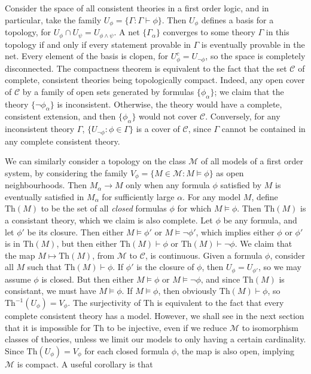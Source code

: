 Consider the space of all consistent theories in a first order logic, and in particular, take the family $U_\phi = \{ \Gamma : \Gamma \vdash \phi \}$. Then $U_\phi$ defines a basis for a topology, for $U_\phi \cap U_\psi = U_{\phi \wedge \psi}$. A net $\{ \Gamma_\alpha \}$ converges to some theory $\Gamma$ in this topology if and only if every statement provable in $\Gamma$ is eventually provable in the net. Every element of the basis is clopen, for $U_\phi^c = U_{\neg \phi}$, so the space is completely disconnected. The compactness theorem is equivalent to the fact that the set $\mathcal{C}$ of complete, consistent theories being topologically compact. Indeed, any open cover of $\mathcal{C}$ by a family of open sets generated by formulas $\{ \phi_\alpha \}$; we claim that the theory $\{ \neg \phi_\alpha \}$ is inconsistent. Otherwise, the theory would have a complete, consistent extension, and then $\{ \phi_\alpha \}$ would not cover $\mathcal{C}$. Conversely, for any inconsistent theory $\Gamma$, $\{ U_{\neg \phi} : \phi \in \Gamma \}$ is a cover of $\mathcal{C}$, since $\Gamma$ cannot be contained in any complete consistent theory.

We can similarly consider a topology on the class $\mathcal{M}$ of all models of a first order system, by considering the family $V_\phi = \{ M \in \mathcal{M} : M \vDash \phi \}$ as open neighbourhoods. Then $M_\alpha \to M$ only when any formula $\phi$ satisfied by $M$ is eventually satisfied in $M_\alpha$ for sufficiently large $\alpha$. For any model $M$, define $\text{Th}(M)$ to be the set of all {\it closed} formulas $\phi$ for which $M \vDash \phi$. Then $\text{Th}(M)$ is a consistant theory, which we claim is also complete. Let $\phi$ be any formula, and let $\phi'$ be its closure. Then either $M \vDash \phi'$ or $M \vDash \neg \phi'$, which implies either $\phi$ or $\phi'$ is in $\text{Th}(M)$, but then either $\text{Th}(M) \vdash \phi$ or $\text{Th}(M) \vdash \neg \phi$. We claim that the map $M \mapsto \text{Th}(M)$, from $\mathcal{M}$ to $\mathcal{C}$, is continuous. Given a formula $\phi$, consider all $M$ such that $\text{Th}(M) \vdash \phi$. If $\phi'$ is the closure of $\phi$, then $U_\phi = U_{\phi'}$, so we may assume $\phi$ is closed. But then either $M \vDash \phi$ or $M \vDash \neg \phi$, and since $\text{Th}(M)$ is consistant, we must have $M \vDash \phi$. If $M \vDash \phi$, then obviously $\text{Th}(M) \vdash \phi$, so $\text{Th}^{-1}(U_\phi) = V_\phi$. The surjectivity of $\text{Th}$ is equivalent to the fact that every complete consistent theory has a model. However, we shall see in the next section that it is impossible for $\text{Th}$ to be injective, even if we reduce $\mathcal{M}$ to isomorphism classes of theories, unless we limit our models to only having a certain cardinality. Since $\text{Th}(U_\phi) = V_\phi$ for each closed formula $\phi$, the map is also open, implying $\mathcal{M}$ is compact. A useful corollary is that

